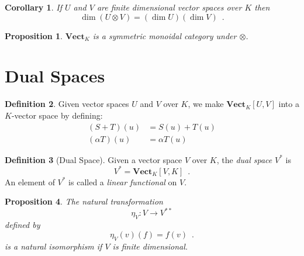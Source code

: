 \documentclass{book}
\newtheorem{prop}{Proposition}[chapter]
\newtheorem{cor}{Corollary}[prop]
\theoremstyle{definition}
\newtheorem{df}[prop]{Definition}
\newcommand{\Vect}[1]{\ensuremath{\mathbf{Vect}_{#1}}}
\begin{document}
\begin{cor}
If $U$ and $V$ are finite dimensional vector spaces over $K$ then
\[ \dim (U \otimes V) = (\dim U)(\dim V) \enspace . \]
\end{cor}

\begin{prop}
$\mathbf{Vect}_K$ is a symmetric monoidal category under $\otimes$.
\end{prop}

\section{Dual Spaces}

\begin{df}
Given vector spaces $U$ and $V$ over $K$, we make $\mathbf{Vect}_K[U,V]$ into a $K$-vector space by defining:
\begin{align*}
(S + T)(u) & = S(u) + T(u) \\
(\alpha T)(u) & = \alpha T(u)
\end{align*}
\end{df}

\begin{df}[Dual Space]
Given a vector space $V$ over $K$, the \emph{dual space} $V^*$ is
\[ V^* = \Vect{K}[V,K] \enspace . \]
An element of $V^*$ is called a \emph{linear functional} on $V$.
\end{df}

\begin{prop}
The natural transformation
\[ \eta_V : V \rightarrow V^{**} \]
defined by
\[ \eta_V(v)(f) = f(v) \enspace . \]
is a natural isomorphism if $V$ is finite dimensional.
\end{prop}
\end{document}
